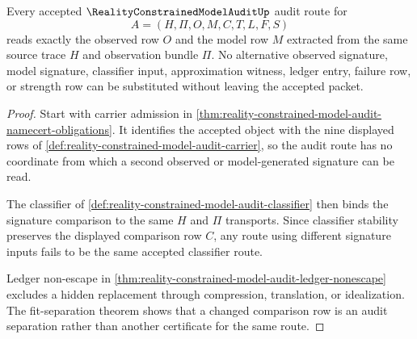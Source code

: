 \begin{theorem}
\label{thm:reality-constrained-model-audit-signature-exactness}
Every accepted $\RealityConstrainedModelAuditUp$ audit route for
$$
A=(H,\Pi,O,M,C,T,L,F,S)
$$
reads exactly the observed row $O$ and the model row $M$ extracted from the same source trace $H$ and observation bundle $\Pi$. No alternative observed signature, model signature, classifier input, approximation witness, ledger entry, failure row, or strength row can be substituted without leaving the accepted packet.
\end{theorem}
\begin{proof}
Start with carrier admission in \autoref{thm:reality-constrained-model-audit-namecert-obligations}. It identifies the accepted object with the nine displayed rows of \autoref{def:reality-constrained-model-audit-carrier}, so the audit route has no coordinate from which a second observed or model-generated signature can be read.

The classifier of \autoref{def:reality-constrained-model-audit-classifier} then binds the signature comparison to the same $H$ and $\Pi$ transports. Since classifier stability preserves the displayed comparison row $C$, any route using different signature inputs fails to be the same accepted classifier route.

Ledger non-escape in \autoref{thm:reality-constrained-model-audit-ledger-nonescape} excludes a hidden replacement through compression, translation, or idealization. The fit-separation theorem shows that a changed comparison row is an audit separation rather than another certificate for the same route.
\end{proof}

